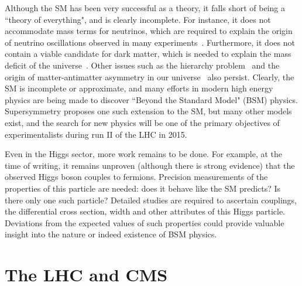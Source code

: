 \documentclass[10pt]{article}
\begin{document}
Although the SM has been very successful as a theory, it falls short of being a “theory of everything", and is clearly incomplete. For instance, it does not accommodate mass terms for neutrinos, which are required to explain the origin of neutrino oscillations observed in many experiments~\cite{SuperK,SNO,DayaBay}. Furthermore, it does not contain a viable candidate for dark matter, which is needed to explain the mass deficit of the universe~\cite{DM}. Other issues such as the hierarchy problem~\cite{Hierarchy} and the origin of matter-antimatter asymmetry in our universe~\cite{Asymmetry} also persist. Clearly, the SM is incomplete or approximate, and many efforts in modern high energy physics are being made to discover “Beyond the Standard Model" (BSM) physics. Supersymmetry proposes one such extension to the SM, but many other models exist, and the search for new physics will be one of the primary objectives of experimentalists during run II of the LHC in 2015.

Even in the  Higgs sector, more work remains to be done. For example, at the time of writing, it remains unproven (although there is strong evidence) that the observed Higgs boson couples to fermions. Precision measurements of the properties of this particle are needed: does it behave like the SM predicts? Is there only one such particle? Detailed studies are required to ascertain couplings, the differential cross section, width and other attributes of this Higgs particle. Deviations from the expected values of such properties could provide valuable insight into the nature or indeed existence of BSM physics.

\section{The LHC and CMS}
\end{document}
